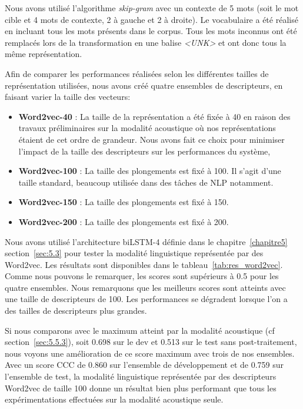 

Nous avons utilisé l'algorithme \textit{skip-gram} avec un contexte de 5 mots (soit le mot cible et 4 mots de contexte, 2 à gauche et 2 à droite). Le vocabulaire a été réalisé en incluant tous les mots présents dans le corpus. Tous les mots inconnus ont été remplacés lors de la transformation en une balise \textit{<UNK>} et ont donc tous la même représentation.

Afin de comparer les performances réalisées selon les différentes tailles de représentation utilisées, nous avons créé quatre ensembles de descripteurs, en faisant varier la taille des vecteurs:
\begin{itemize}
  \item \textbf{Word2vec-40} : La taille de la représentation a été fixée à 40 en raison des travaux préliminaires sur la modalité acoustique où nos représentations étaient de cet ordre de grandeur. Nous avons fait ce choix pour minimiser l'impact de la taille des descripteurs sur les performances du système,
  \item \textbf{Word2vec-100} : La taille des plongements est fixé à 100. Il s'agit d'une taille standard, beaucoup utilisée dans des tâches de NLP notamment.
  \item \textbf{Word2vec-150} : La taille des plongements est fixé à 150.
  \item \textbf{Word2vec-200} : La taille des plongements est fixé à 200. %
\end{itemize}

Nous avons utilisé l'architecture biLSTM-4 définie dans le chapitre~\ref{chapitre5} section~\ref{sec:5.3} pour tester la modalité linguistique représentée par des Word2vec. Les résultats sont disponibles dans le tableau~\ref{tab:res_word2vec}. Comme nous pouvons le remarquer, les scores sont supérieurs à 0.5 pour les quatre ensembles. Nous remarquons que les meilleurs scores sont atteints avec une taille de descripteurs de 100. Les performances se dégradent lorsque l'on a des tailles de descripteurs plus grandes.

Si nous comparons avec le maximum atteint par la modalité acoustique (cf section~\ref{sec:5.5.3}), soit 0.698 sur le dev et 0.513 sur le test sans post-traitement, nous voyons une amélioration de ce score maximum avec trois de nos ensembles. Avec un score CCC de 0.860 sur l'ensemble de développement et de 0.759 sur l'ensemble de test, la modalité linguistique représentée par des descripteurs Word2vec de taille 100 donne un résultat bien plus performant que tous les expérimentations effectuées sur la modalité acoustique seule.


